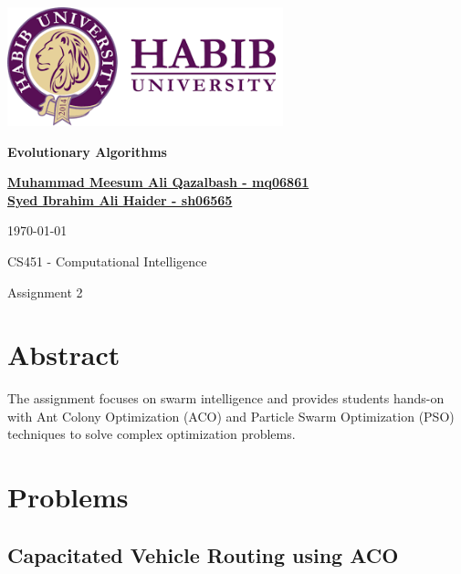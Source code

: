 \documentclass[12pt]{report}
\begin{document}
\begin{titlepage}
	\vspace*{\fill}

	\begin{center}


		\includegraphics[width=0.6\textwidth]{images/logo.png}

		\vspace{2cm}

		\Huge
		\textbf{Evolutionary Algorithms}
		\vspace{5.5cm}

		\Large

		\textbf{ \href{mailto:mq06861@st.habib.edu.pk}{Muhammad Meesum Ali Qazalbash - mq06861}}\\
		\textbf{ \href{mailto:@st.habib.edu.pk}{{Syed Ibrahim Ali Haider - sh06565}}}

		\vspace{0.5cm}

		\today

		CS451 - Computational Intelligence

		\vspace{0.5cm}
		\large
		Assignment 2
	\end{center}

	\vspace*{\fill}
\end{titlepage}

\setcounter{page}{2}
\tableofcontents

\chapter{Abstract}
The assignment focuses on swarm intelligence and provides students hands-on with Ant Colony Optimization (ACO) and Particle Swarm Optimization (PSO) techniques to solve complex optimization problems.

\chapter{Problems}

\section{Capacitated Vehicle Routing using ACO}
\end{document}
